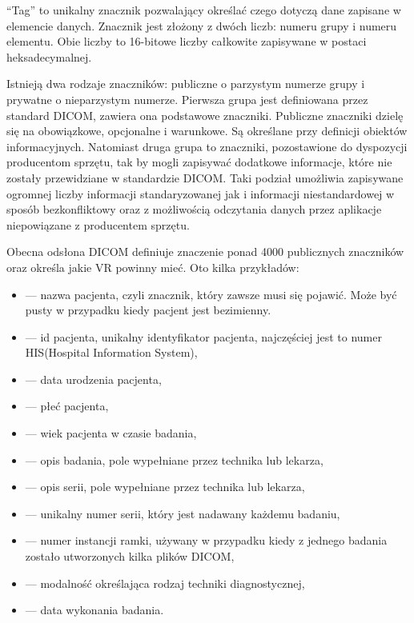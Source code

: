 \par
\enquote{Tag} to unikalny znacznik pozwalający określać czego dotyczą dane zapisane w elemencie danych.
Znacznik jest złożony z dwóch liczb: numeru grupy i numeru elementu.
Obie liczby to 16-bitowe liczby całkowite zapisywane w postaci  heksadecymalnej.

\par
Istnieją dwa rodzaje znaczników: publiczne o parzystym numerze grupy i prywatne o nieparzystym numerze.
Pierwsza grupa jest definiowana przez standard DICOM, zawiera ona podstawowe znaczniki.
Publiczne znaczniki dzielę się na obowiązkowe, opcjonalne i warunkowe.
Są określane przy definicji obiektów informacyjnych.
Natomiast druga grupa to znaczniki, pozostawione do dyspozycji producentom sprzętu, tak by mogli zapisywać dodatkowe informacje, które nie zostały przewidziane w standardzie DICOM.
Taki podział umożliwia zapisywane ogromnej liczby informacji standaryzowanej jak i informacji niestandardowej w sposób bezkonfliktowy oraz z możliwością odczytania danych przez aplikacje niepowiązane z producentem sprzętu.

\par
Obecna odsłona DICOM definiuje znaczenie ponad 4000 publicznych znaczników oraz określa jakie VR powinny mieć.
Oto kilka przykładów:
\begin{itemize}
    \item {} --- nazwa pacjenta, czyli znacznik, który zawsze musi się pojawić.
          Może być pusty w przypadku kiedy pacjent jest bezimienny.
    \item {} --- id pacjenta, unikalny identyfikator pacjenta, najczęściej jest to numer HIS(Hospital Information System),
    \item {} --- data urodzenia pacjenta,
    \item {} --- płeć pacjenta,
    \item {} --- wiek pacjenta w czasie badania,
    \item {} --- opis badania, pole wypełniane przez technika lub lekarza,
    \item {} --- opis serii, pole wypełniane przez technika lub lekarza,
    \item {} --- unikalny numer serii, który jest nadawany każdemu badaniu,
    \item {} --- numer instancji ramki, używany w przypadku kiedy z jednego badania zostało utworzonych kilka plików DICOM,
    \item {} --- modalność określająca rodzaj techniki diagnostycznej,
    \item {} --- data wykonania badania.
\end{itemize}


